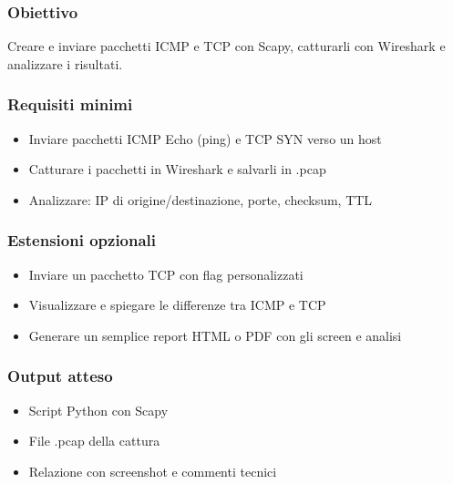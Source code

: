 \documentclass[12pt,a4paper]{report}
\begin{document}
\subsubsection{Obiettivo}
Creare e inviare pacchetti ICMP e TCP con Scapy, catturarli con Wireshark e analizzare i risultati.

\subsubsection{Requisiti minimi}
\begin{itemize}
	\item Inviare pacchetti ICMP Echo (ping) e TCP SYN verso un host
	\item Catturare i pacchetti in Wireshark e salvarli in .pcap
	\item Analizzare: IP di origine/destinazione, porte, checksum, TTL
\end{itemize}

\subsubsection{Estensioni opzionali}
\begin{itemize}
	\item Inviare un pacchetto TCP con flag personalizzati
	\item Visualizzare e spiegare le differenze tra ICMP e TCP
	\item Generare un semplice report HTML o PDF con gli screen e analisi
\end{itemize}

\subsubsection{Output atteso}

\begin{itemize}
	\item Script Python con Scapy
	\item File .pcap della cattura
	\item Relazione con screenshot e commenti tecnici
\end{itemize}
\end{document}
